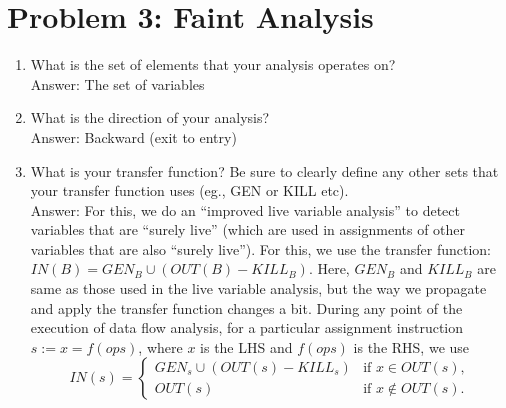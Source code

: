 \section*{Problem 3: Faint Analysis}

\begin{enumerate}
\item What is the set of elements that your analysis operates on? \\
Answer: The set of variables
\item What is the direction of your analysis? \\
Answer: Backward (exit to entry)
\item What is your transfer function? Be sure to clearly define any other sets that your transfer function uses (eg., GEN or KILL etc). \\
Answer: For this, we do an ``improved live variable analysis'' to detect variables that are ``surely live'' (which are used in assignments of other variables that are also ``surely live''). For this, we use the transfer function: $IN(B) = GEN_B \cup (OUT(B)-KILL_B)$. Here, $GEN_B$ and $KILL_B$ are same as those used in the live variable analysis, but the way we propagate and apply the transfer function changes a bit. During any point of the execution of data flow analysis, for a particular assignment instruction $s:= x = f(ops)$, where $x$ is the LHS and $f(ops)$ is the RHS, we use
\[
IN(s) = \left\{ 
\begin{array}{ll}
GEN_s \cup (OUT(s)-KILL_s) & \mbox{if } x \in OUT(s),\\
OUT(s) & \mbox{if } x \notin OUT(s).
\end{array}
\right.
\]


\end{enumerate}
